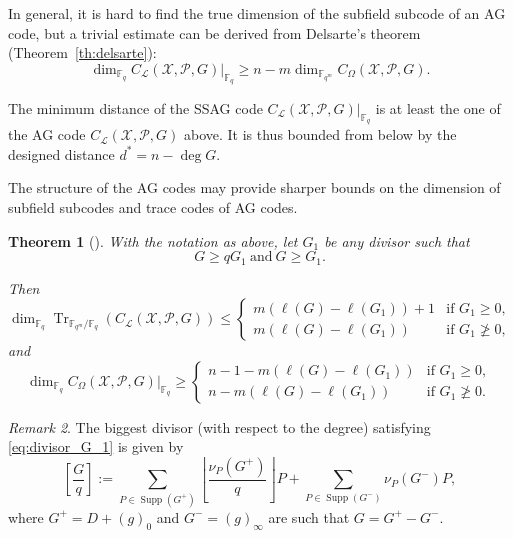\documentclass[a4paper]{amsart}
\newtheorem{thm}{Theorem}[section]
\theoremstyle{definition}
\theoremstyle{remark}
\newtheorem{remark}[thm]{Remark}
\newcommand{\calP}{\mathcal{P}}
\newcommand{\calL}{\mathcal{L}}
\newcommand{\calX}{\mathcal{X}}
\newcommand{\fqm}{\mathbb{F}_{q^m}}
\newcommand{\fq}{\mathbb{F}_{q}}
\newcommand{\Tr}[1]{\operatorname{Tr}_{\mathbb{F}_{q^m}/\fq}\left(#1\right)}
\newcommand{\Supp}{\operatorname{Supp}}
\newcommand{\ssag}[1]{\operatorname{\mathsf{SSAG}}_{q}\left(#1\right)}
\begin{document}

In general, it is hard to find the true dimension of the subfield subcode of an AG code, but a trivial estimate can be derived from Delsarte's theorem (Theorem~\ref{th:delsarte}):
\begin{equation}\label{eq:dim_ssag}
	\dim_{\fq} C_{\calL}(\calX,\calP,G)|_{\fq} \geq n - m\dim_{\fqm} C_{\Omega}(\calX,\calP,G).
\end{equation}

The minimum distance of the SSAG code $C_{\calL}(\calX,\calP,G)|_{\fq}$ is at least the one of the AG code $C_{\calL}(\calX,\calP,G)$ above. It is thus bounded from below by the designed distance $d^*=n-\deg G$.%

The structure of the AG codes may provide sharper bounds on the dimension of subfield subcodes and trace codes of AG codes.

\begin{thm}[{\cite[Theorem~9.1.6]{Sti09}}]\label{thm:dim_ssag}
	With the notation as above, let $G_1$ be any divisor such that 
	\begin{equation} \label{eq:divisor_G_1}
		G \geq qG_1 \ \mathrm{and} \ G \geq G_1.
	\end{equation}

	Then
\[	\dim_{\fq} \Tr{C_{\calL}(\calX,\calP,G)} \leq  \left\{\begin{array}{ll}
	m\left(\ell(G) - \ell(G_1)\right)+1 & \text{if } G_1 \geq 0, \\
	m\left(\ell(G) - \ell(G_1)\right) & \text{if } G_1 \not\geq 0, 
\end{array} \right.\]	
	and	
\[	\dim_{\fq} C_{\Omega}(\calX,\calP,G)|_{\fq} \geq  \left\{\begin{array}{ll}
	n-1-m\left(\ell(G) - \ell(G_1)\right) & \text{if } G_1 \geq 0, \\
	n-m\left(\ell(G) - \ell(G_1)\right) & \text{if } G_1 \not\geq 0. 
\end{array} \right.\]
\end{thm}

\begin{remark}\label{rk:G/q}
	The biggest divisor (with respect to the degree) satisfying \eqref{eq:divisor_G_1} is given by 
	\begin{equation}\label{eq:G/q}
		\left[ \frac{G}{q} \right]:= \sum\limits_{P \in \Supp(G^+)} \left\lfloor\frac{\nu_P(G^+)}{q}\right\rfloor P + \sum\limits_{P \in \Supp(G^-)}\nu_P(G^-)P,
	\end{equation}
	where $G^+ = D+(g)_0$ and $G^-=(g)_\infty$ are such that $G=G^+-G^-$.
\end{remark}
\end{document}
